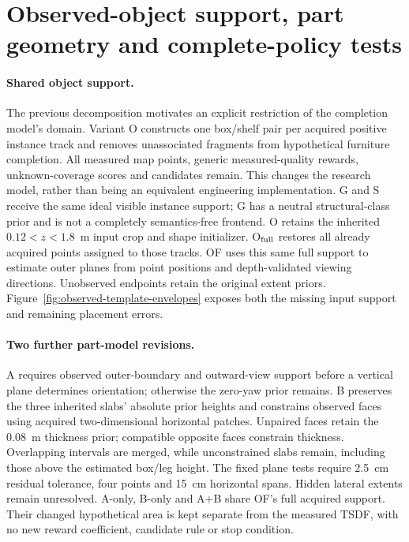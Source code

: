 \clearpage
\section{Observed-object support, part geometry and complete-policy tests}
\label{sec:observed-object-parts}

\paragraph{Shared object support.}
The previous decomposition motivates an explicit restriction of the completion model's domain. Variant O constructs one box/shelf pair per acquired positive instance track and removes unassociated fragments from hypothetical furniture completion. All measured map points, generic measured-quality rewards, unknown-coverage scores and candidates remain. This changes the research model, rather than being an equivalent engineering implementation. G and S receive the same ideal visible instance support; G has a neutral structural-class prior and is not a completely semantics-free frontend. O retains the inherited $0.12<z<1.8$~m input crop and shape initializer. O$_{\rm full}$ restores all already acquired points assigned to those tracks. OF uses this same full support to estimate outer planes from point positions and depth-validated viewing directions. Unobserved endpoints retain the original extent priors. Figure~\ref{fig:observed-template-envelopes} exposes both the missing input support and remaining placement errors.

\paragraph{Two further part-model revisions.}
A requires observed outer-boundary and outward-view support before a vertical plane determines orientation; otherwise the zero-yaw prior remains. B preserves the three inherited slabs' absolute prior heights and constrains observed faces using acquired two-dimensional horizontal patches. Unpaired faces retain the 0.08~m thickness prior; compatible opposite faces constrain thickness. Overlapping intervals are merged, while unconstrained slabs remain, including those above the estimated box/leg height. The fixed plane tests require 2.5~cm residual tolerance, four points and 15~cm horizontal spans. Hidden lateral extents remain unresolved. A-only, B-only and A+B share OF's full acquired support. Their changed hypothetical area is kept separate from the measured TSDF, with no new reward coefficient, candidate rule or stop condition.

